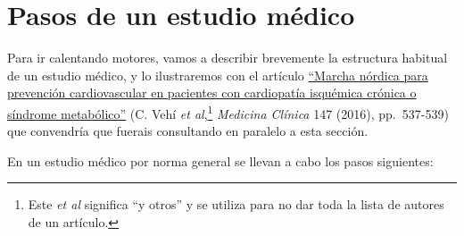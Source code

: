 \documentclass[
]{book}
\theoremstyle{definition}
\theoremstyle{definition}
\theoremstyle{definition}
\theoremstyle{definition}
\theoremstyle{remark}
\begin{document}
\hypertarget{sec:pasos}{%
\section{Pasos de un estudio médico}\label{sec:pasos}}

Para ir calentando motores, vamos a describir brevemente la estructura habitual de un estudio médico, y lo ilustraremos con el artículo \href{https://www.sciencedirect.com/science/article/pii/S0025775316305024}{``Marcha nórdica para prevención cardiovascular en pacientes con cardiopatía isquémica crónica o síndrome metabólico''} (C. Vehí \emph{et al},\footnote{Este \emph{et al} significa ``y otros'' y se utiliza para no dar toda la lista de autores de un artículo.} \emph{Medicina Clínica} 147 (2016), pp.~537-539) que convendría que fuerais consultando en paralelo a esta sección.

En un estudio médico por norma general se llevan a cabo los pasos siguientes:
\end{document}
